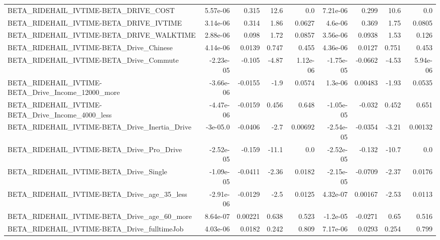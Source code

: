 \begin{tabular}{lrrrrrrrr}
BETA\_RIDEHAIL\_IVTIME-BETA\_DRIVE\_COST               &    5.57e-06 &        0.315 &     12.6 &      0.0 &   7.21e-06 &       0.299 &         10.6 &           0.0 \\
BETA\_RIDEHAIL\_IVTIME-BETA\_DRIVE\_IVTIME             &    3.14e-06 &        0.314 &     1.86 &   0.0627 &    4.6e-06 &       0.369 &         1.75 &        0.0805 \\
BETA\_RIDEHAIL\_IVTIME-BETA\_DRIVE\_WALKTIME           &    2.88e-06 &        0.098 &     1.72 &   0.0857 &   3.56e-06 &      0.0938 &         1.53 &         0.126 \\
BETA\_RIDEHAIL\_IVTIME-BETA\_Drive\_Chinese            &    4.14e-06 &       0.0139 &    0.747 &    0.455 &   4.36e-06 &      0.0127 &        0.751 &         0.453 \\
BETA\_RIDEHAIL\_IVTIME-BETA\_Drive\_Commute            &   -2.23e-05 &       -0.105 &    -4.87 & 1.12e-06 &  -1.75e-05 &     -0.0662 &        -4.53 &      5.94e-06 \\
BETA\_RIDEHAIL\_IVTIME-BETA\_Drive\_Income\_12000\_more  &   -3.66e-06 &      -0.0155 &     -1.9 &   0.0574 &    1.3e-06 &     0.00483 &        -1.93 &        0.0535 \\
BETA\_RIDEHAIL\_IVTIME-BETA\_Drive\_Income\_4000\_less   &   -4.47e-06 &      -0.0159 &    0.456 &    0.648 &  -1.05e-05 &      -0.032 &        0.452 &         0.651 \\
BETA\_RIDEHAIL\_IVTIME-BETA\_Drive\_Inertia\_Drive      &    -3e-05.0 &      -0.0406 &     -2.7 &  0.00692 &  -2.54e-05 &     -0.0354 &        -3.21 &       0.00132 \\
BETA\_RIDEHAIL\_IVTIME-BETA\_Drive\_Pro\_Drive          &   -2.52e-05 &       -0.159 &    -11.1 &      0.0 &  -2.52e-05 &      -0.132 &        -10.7 &           0.0 \\
BETA\_RIDEHAIL\_IVTIME-BETA\_Drive\_Single             &   -1.09e-05 &      -0.0411 &    -2.36 &   0.0182 &  -2.15e-05 &     -0.0709 &        -2.37 &        0.0176 \\
BETA\_RIDEHAIL\_IVTIME-BETA\_Drive\_age\_35\_less        &   -2.91e-06 &      -0.0129 &     -2.5 &   0.0125 &   4.32e-07 &     0.00167 &        -2.53 &        0.0113 \\
BETA\_RIDEHAIL\_IVTIME-BETA\_Drive\_age\_60\_more        &    8.64e-07 &      0.00221 &    0.638 &    0.523 &   -1.2e-05 &     -0.0271 &         0.65 &         0.516 \\
BETA\_RIDEHAIL\_IVTIME-BETA\_Drive\_fulltimeJob        &    4.03e-06 &       0.0182 &    0.242 &    0.809 &   7.17e-06 &      0.0293 &        0.254 &         0.799 \\

\end{tabular}
